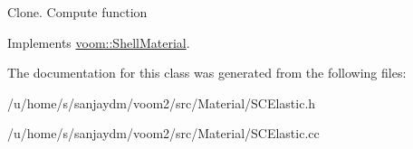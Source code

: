 Clone. Compute function 

Implements \hyperlink{classvoom_1_1_shell_material_a959c8ad040d53a39218a7dbe6258472d}{voom::ShellMaterial}.

The documentation for this class was generated from the following files:\begin{DoxyCompactItemize}
\item 
/u/home/s/sanjaydm/voom2/src/Material/SCElastic.h\item 
/u/home/s/sanjaydm/voom2/src/Material/SCElastic.cc\end{DoxyCompactItemize}
